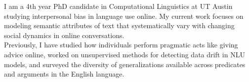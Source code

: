 I am a 4th year PhD candidate in Computational Linguistics at UT Austin studying interpersonal bias in language use online. My current work focuses on modeling semantic attributes of text that systematically vary with changing social dynamics in online conversations.\\
Previously, I have studied how individuals perform pragmatic acts like giving advice online, worked on unsupervised methods for detecting data drift in NLU models, and surveyed the diversity of generalizations available across predicates and arguments in the English language.
